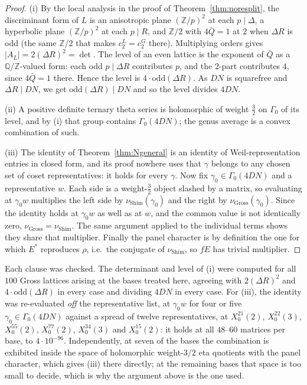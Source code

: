 \documentclass[11pt,reqno]{amsart}
\theoremstyle{plain}
\theoremstyle{definition}
\newcommand{\Q}{\mathbb{Q}}
\newcommand{\Z}{\mathbb{Z}}
\begin{document}
\begin{proof}
(i) By the local analysis in the proof of Theorem~\ref{thm:noresplit}, the discriminant
form of $L$ is an anisotropic plane $(\Z/p)^2$ at each $p\mid\Delta$, a hyperbolic plane
$(\Z/p)^2$ at each $p\mid R$, and $\Z/2$ with $4\bar Q=1$ at $2$ when $\Delta R$ is odd
(the same $\Z/2$ that makes $c_2^L=c_2^G$ there). Multiplying orders gives
$|A_L|=2(\Delta R)^2=\det$. The level of an even lattice is the exponent of $\bar Q$ as a
$\Q/\Z$-valued form: each odd $p\mid\Delta R$ contributes $p$, and the $2$-part
contributes $4$, since $4\bar Q=1$ there. Hence the level is
$4\cdot\mathrm{odd}(\Delta R)$. As $DN$ is squarefree and $\Delta R\mid DN$, we get
$\mathrm{odd}(\Delta R)\mid DN$ and so the level divides $4DN$.

(ii) A positive definite ternary theta series is holomorphic of weight $\tfrac32$ on
$\Gamma_0$ of its level, and by (i) that group contains $\Gamma_0(4DN)$; the genus average
is a convex combination of such.

(iii) The identity of Theorem~\ref{thm:Ngeneral} is an identity of Weil-representation
entries in closed form, and its proof nowhere uses that $\gamma$ belongs to any chosen set
of coset representatives: it holds for every $\gamma$. Now fix $\gamma_0\in\Gamma_0(4DN)$
and a representative $w$. Each side is a weight-$\tfrac32$ object slashed by a matrix, so
evaluating at $\gamma_0w$ multiplies the left side by $\nu_{\mathrm{Shim}}(\gamma_0)$ and
the right by $\nu_{\mathrm{Gross}}(\gamma_0)$. Since the identity holds at $\gamma_0w$ as
well as at $w$, and the common value is not identically zero,
$\nu_{\mathrm{Gross}}=\nu_{\mathrm{Shim}}$. The same argument applied to the individual
terms shows they share that multiplier. Finally the panel character is by definition the
one for which $E^*$ reproduces $\rho$, i.e.\ the conjugate of $\nu_{\mathrm{Shim}}$, so
$fE$ has trivial multiplier.
\end{proof}

Each clause was checked. The determinant and level of (i) were computed for all $100$
Gross lattices arising at the bases treated here, agreeing with
$2(\Delta R)^2$ and $4\cdot\mathrm{odd}(\Delta R)$ in every case and dividing $4DN$ in
every case. For (iii), the identity was re-evaluated \emph{off} the representative list,
at $\gamma_0w$ for four or five $\gamma_0\in\Gamma_0(4DN)$ against a spread of twelve
representatives, at $X_0^{21}(2)$, $X_0^{22}(3)$, $X_0^{55}(2)$, $X_0^{77}(2)$,
$X_0^{34}(3)$ and $X_0^{15}(2)$: it holds at all $48$--$60$ matrices per base, to
$4\cdot10^{-96}$. Independently, at seven of the bases the combination is exhibited
inside the space of holomorphic weight-$3/2$ eta quotients with the panel character,
which gives (iii) there directly; at the remaining bases that space is too small to
decide, which is why the argument above is the one used.
\end{document}
